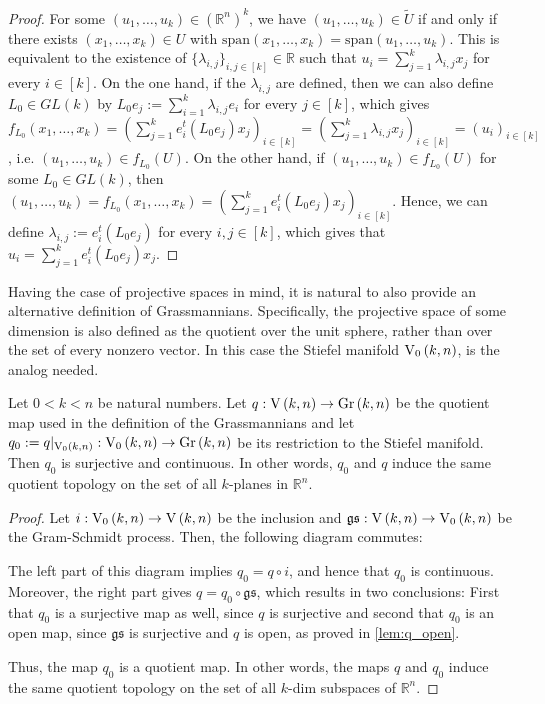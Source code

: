 \begin{proof}
For some $(u_1,\ldots,u_k)\in(\mathbb{R}^n)^k$, we have $(u_1,\ldots,u_k)\in\tilde{U}$ if and only if there exists $(x_1,\ldots,x_k)\in U$ with $\mathrm{span}(x_1,\ldots,x_k)=\mathrm{span}(u_1,\ldots,u_k)$. This is equivalent to the existence of $\{\lambda_{i,j}\}_{i,j\in[k]}\in\mathbb{R}$ such that $u_i=\sum_{j=1}^k\lambda_{i,j}x_j$ for every $i\in[k]$. On the one hand, if the $\lambda_{i,j}$ are defined, then we can also define $L_0\in GL(k)$ by $L_0e_j:=\sum_{i=1}^k\lambda_{i,j}e_i$ for every $j\in[k]$, which gives $f_{L_0}(x_1,\ldots,x_k)=\left(\sum_{j=1}^ke_i^t(L_0e_j)x_j\right)_{i\in[k]}=\left(\sum_{j=1}^k\lambda_{i,j}x_j\right)_{i\in[k]}=(u_i)_{i\in[k]}$, i.e. $(u_1,\ldots,u_k)\in f_{L_0}(U)$. On the other hand, if $(u_1,\ldots,u_k)\in f_{L_0}(U)$ for some $L_0\in GL(k)$, then $(u_1,\ldots,u_k)=f_{L_0}(x_1,\ldots,x_k)=\left(\sum_{j=1}^ke_i^t(L_0e_j)x_j\right)_{i\in[k]}$. Hence, we can define $\lambda_{i,j}:=e_i^t(L_0e_j)$ for every $i,j\in[k]$, which gives that $u_i=\sum_{j=1}^ke_i^t(L_0e_j)x_j$.
\end{proof}

Having the case of projective spaces in mind, it is natural to also provide an alternative definition of Grassmannians.
Specifically, the projective space of some dimension is also defined as the quotient over the unit sphere, rather than over the set of every nonzero vector.
In this case the Stiefel manifold $\StO{k}{n}$, is the analog needed.

\begin{proposition} Let $0<k<n$ be natural numbers. Let $q:\St{k}{n}\to\Gr{k}{n}$ be the quotient map used in the definition of the Grassmannians and let $q_0:=q|_{\StO{k}{n}}:\StO{k}{n}\to\Gr{k}{n}$ be its restriction to the Stiefel manifold. Then $q_0$ is surjective and continuous. In other words, $q_0$ and $q$ induce the same quotient topology on the set of all $k$-planes in $\mathbb{R}^n$.
\end{proposition}
\begin{proof}
Let $i:\StO{k}{n}\to\St{k}{n}$ be the inclusion and $\mathfrak{gs}:\St{k}{n}\to\StO{k}{n}$ be the Gram-Schmidt process. Then, the following diagram commutes:
\begin{center}
\end{center}
The left part of this diagram implies $q_0=q\circ i$, and hence that $q_0$ is continuous. Moreover, the right part gives $q=q_0\circ\mathfrak{gs}$, which results in two conclusions: First that $q_0$ is a surjective map as well, since $q$ is surjective and second that $q_0$ is an open map, since $\mathfrak{gs}$ is surjective and $q$ is open, as proved in \ref{lem:q_open}.

Thus, the map $q_0$ is a quotient map. In other words, the maps $q$ and $q_0$ induce the same quotient topology on the set of all $k$-dim subspaces of $\mathbb{R}^n$.
\end{proof}

